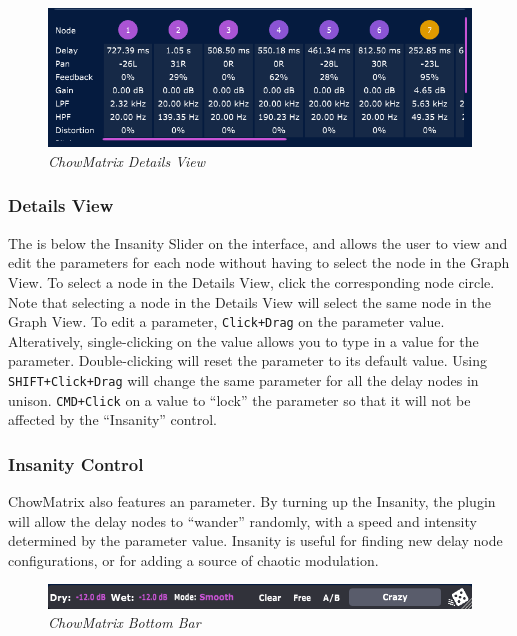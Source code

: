 \documentclass[landscape,twocolumn,a5paper]{manual}
\newcommand\shortcut[1]{\colorbox{highlightcolour}{\texttt{#1}}}
\begin{document}
\begin{figure}[ht]
    \center
    \includegraphics[width=0.9\columnwidth]{screenshots/DetailsView.png}
    \caption{\label{fig:details_view}{\it ChowMatrix Details View}}
\end{figure}

\subsubsection{Details View}
The  is below the Insanity Slider
on the interface, and allows the user to view and edit the
parameters for each node without having to select the node
in the Graph View. To select a node in the Details View,
click the corresponding node circle. Note that selecting
a node in the Details View will select the same node in
the Graph View.
\newpar
To edit a parameter, \shortcut{Click+Drag} on the parameter
value. Alteratively, single-clicking on the value allows
you to type in a value for the parameter. Double-clicking
will reset the parameter to its default value.
\newline
Using \shortcut{SHIFT+Click+Drag}
will change the same parameter for all the delay nodes in
unison. \shortcut{CMD+Click} on a value to ``lock'' the
parameter so that it will not be affected by the ``Insanity''
control.

\subsubsection{Insanity Control}
ChowMatrix also features an  parameter.
By turning up the Insanity, the plugin will allow the delay
nodes to ``wander'' randomly, with a speed and intensity
determined by the parameter value. Insanity is useful for
finding new delay node configurations, or for adding a source
of chaotic modulation.

\begin{figure}[ht]
    \center
    \includegraphics[width=0.95\columnwidth]{screenshots/BottomBar.png}
    \caption{\label{fig:details_view}{\it ChowMatrix Bottom Bar}}
\end{figure}
\end{document}
